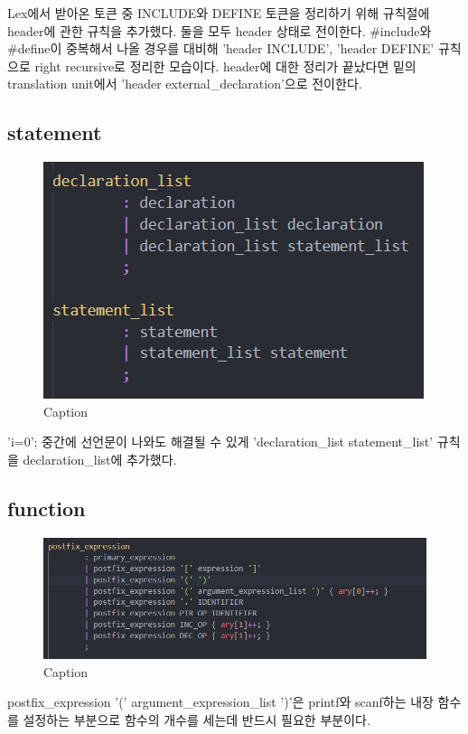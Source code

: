 \documentclass{article}
\begin{document}
Lex에서 받아온 토큰 중 INCLUDE와 DEFINE 토큰을 정리하기 위해 규칙절에 header에 관한 규칙을 추가했다. 둘을 모두 header 상태로 전이한다. #include와 #define이 중복해서 나올 경우를 대비해 'header INCLUDE', 'header DEFINE' 규칙으로 right recursive로 정리한 모습이다. header에 대한 정리가 끝났다면 밑의 translation unit에서 'header external\_declaration'으로 전이한다.

\subsection{statement}
\begin{figure}[h]
    \centering
    \includegraphics[scale = 0.8]{statement.png}
    \caption{Caption}
\end{figure}

'i=0'; 중간에 선언문이 나와도 해결될 수 있게 'declaration\_list statement\_list' 규칙을 declaration\_list에 추가했다.

\newpage

\subsection{function}
\begin{figure}[h]
    \centering
    \includegraphics[scale = 0.8]{function1.png}
    \caption{Caption}
\end{figure}
postfix\_expression '(' argument\_expression\_list ')'은 printf와 scanf하는 내장 함수를 설정하는 부분으로 함수의 개수를 세는데 반드시 필요한 부분이다.
\end{document}
